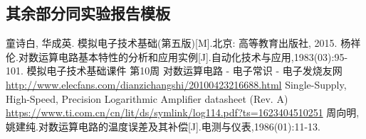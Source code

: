 \documentclass[UTF8]{ctexart}  %
\begin{document}
\subsection{其余部分同实验报告模板}


\newpage

\begin{thebibliography}{}
    童诗白, 华成英. 模拟电子技术基础(第五版)[M].北京: 高等教育出版社, 2015.
    杨祥伦.对数运算电路基本特性的分析和应用实例[J].自动化技术与应用,1983(03):95-101.
    模拟电子技术基础课件 第10周
    对数运算电路 - 电子常识 - 电子发烧友网\\\url{http://www.elecfans.com/dianzichangshi/20100423216688.html}
    Single-Supply, High-Speed, Precision Logarithmic Amplifier datasheet (Rev. A)\\\url{https://www.ti.com.cn/cn/lit/ds/symlink/log114.pdf?ts=1623404510251}
    周向明,姚建纯.对数运算电路的温度误差及其补偿[J].电测与仪表,1986(01):11-13.
\end{thebibliography}
\end{document}
